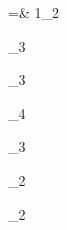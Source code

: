=& 1_{2}\,\begin{ydpair}
\end{ydpair} _{3}\,\begin{ydpair}
\end{ydpair} _{3}\,\begin{ydpair}
\end{ydpair} _{4}\,\begin{ydpair}
\end{ydpair} _{3}\,\begin{ydpair}
  \covar{
    [] 
  }
\end{ydpair} _{2}\,\begin{ydpair}
  \convar{
    [] \ensuremath{\bullet}
  }
\end{ydpair} _{2}\,\begin{ydpair}
\end{ydpair} \\
